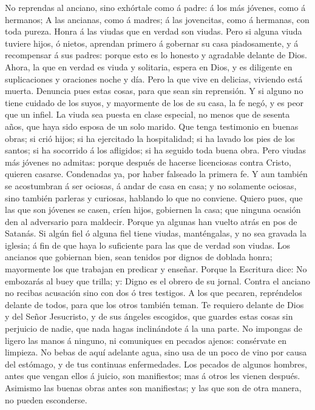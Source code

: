  No reprendas al anciano, sino exhórtale como á padre: á
los más jóvenes, como á hermanos;  A las ancianas, como á
madres; á las jovencitas, como á hermanas, con toda pureza.
 Honra á las viudas que en verdad son viudas.
 Pero si alguna viuda tuviere hijos, ó nietos, aprendan
primero á gobernar su casa piadosamente, y á recompensar á sus padres:
porque esto es lo honesto y agradable delante de Dios. 
Ahora, la que en verdad es viuda y solitaria, espera en Dios, y es
diligente en suplicaciones y oraciones noche y día.  Pero
la que vive en delicias, viviendo está muerta.  Denuncia
pues estas cosas, para que sean sin reprensión.  Y si
alguno no tiene cuidado de los suyos, y mayormente de los de su casa, la
fe negó, y es peor que un infiel.  La viuda sea puesta en
clase especial, no menos que de sesenta años, que haya sido esposa de un
solo marido.  Que tenga testimonio en buenas obras; si
crió hijos; si ha ejercitado la hospitalidad; si ha lavado los pies de
los santos; si ha socorrido á los afligidos; si ha seguido toda buena
obra.  Pero viudas más jóvenes no admitas: porque después
de hacerse licenciosas contra Cristo, quieren casarse. 
Condenadas ya, por haber falseado la primera fe.  Y aun
también se acostumbran á ser ociosas, á andar de casa en casa; y no
solamente ociosas, sino también parleras y curiosas, hablando lo que no
conviene.  Quiero pues, que las que son jóvenes se casen,
críen hijos, gobiernen la casa; que ninguna ocasión den al adversario
para maldecir.  Porque ya algunas han vuelto atrás en pos
de Satanás.  Si algún fiel ó alguna fiel tiene viudas,
manténgalas, y no sea gravada la iglesia; á fin de que haya lo
suficiente para las que de verdad son viudas.  Los
ancianos que gobiernan bien, sean tenidos por dignos de doblada honra;
mayormente los que trabajan en predicar y enseñar. 
Porque la Escritura dice: No embozarás al buey que trilla; y: Digno es
el obrero de su jornal.  Contra el anciano no recibas
acusación sino con dos ó tres testigos.  A los que
pecaren, repréndelos delante de todos, para que los otros también teman.
 Te requiero delante de Dios y del Señor Jesucristo, y de
sus ángeles escogidos, que guardes estas cosas sin perjuicio de nadie,
que nada hagas inclinándote á la una parte.  No impongas
de ligero las manos á ninguno, ni comuniques en pecados ajenos:
consérvate en limpieza.  No bebas de aquí adelante agua,
sino usa de un poco de vino por causa del estómago, y de tus continuas
enfermedades.  Los pecados de algunos hombres, antes que
vengan ellos á juicio, son manifiestos; mas á otros les vienen después.
 Asimismo las buenas obras antes son manifiestas; y las
que son de otra manera, no pueden esconderse.

